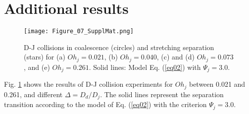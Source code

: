 \documentclass{article}
\begin{document}
\FloatBarrier
\section{Additional results } \label{appG}
\begin{figure}
\centering
\texttt{[image: Figure\_07\_SupplMat.png]}
\caption{\label{app_fig07} D-J collisions in coalescence (circles) and stretching separation (stars) for (a) $Oh_j=0.021$, (b) $Oh_j=0.040$, (c) and (d) $Oh_j=0.073$, and (e) $Oh_j=0.261$. Solid lines: Model Eq. (\ref{eq02}) with $\Psi_j=3.0$.}
\end{figure}
Fig. \ref{app_fig07} shows the results of D-J collision experiments for $Oh_j$ between 0.021 and 0.261, and different $\Delta=D_d/D_j$. The solid lines represent the separation transition according to the model of Eq. (\ref{eq02}) with the criterion $\Psi_j=3.0$.


\FloatBarrier





   
\end{document}
